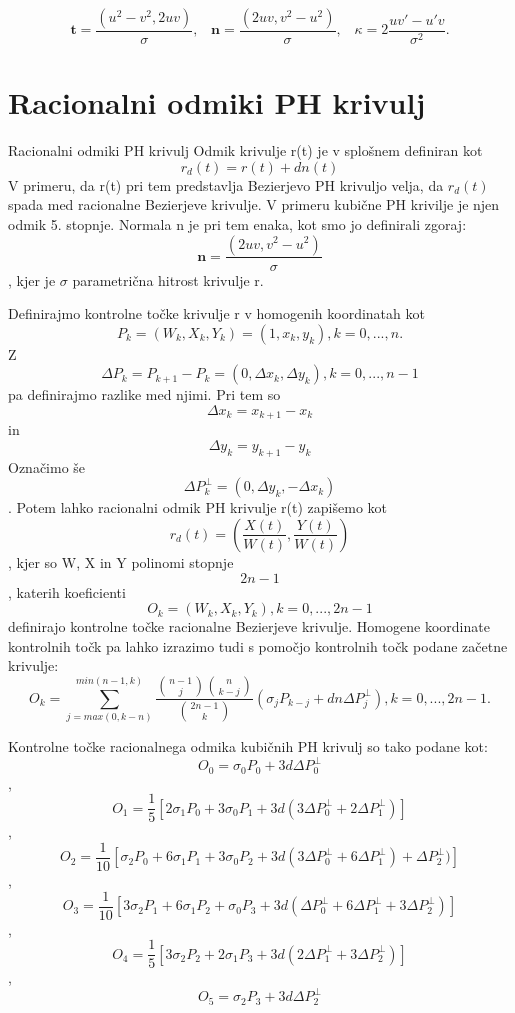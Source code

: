 \documentclass[12pt]{article}
\begin{document}
$$\textbf{t} =\frac{(u^2 - v^2, 2uv)}{\sigma},\hspace{10pt} \textbf{n} =\frac{(2uv, v^2 - u^2)}{\sigma},\hspace{10pt} \kappa = 2 \frac{uv\prime - u\prime v}{\sigma^2}.$$

\section*{Racionalni odmiki PH krivulj}
Racionalni odmiki PH krivulj
Odmik krivulje r(t) je v splošnem definiran kot
$$ r_d(t) = r(t) + dn(t)$$
V primeru, da r(t) pri tem predstavlja Bezierjevo PH krivuljo velja, 
da $r_d(t)$ spada med racionalne Bezierjeve krivulje. V primeru kubične PH krivilje 
je njen odmik 5. stopnje. Normala n je pri tem enaka, kot smo jo definirali zgoraj:
$$\textbf{n} =\frac{(2uv, v^2 - u^2)}{\sigma}$$,
kjer je $\sigma$ parametrična hitrost krivulje r.

Definirajmo kontrolne točke krivulje r v homogenih koordinatah kot
$$ P_k = (W_k, X_k, Y_k) = (1, x_k, y_k), k = 0, ..., n.$$
Z $$\Delta P_k = P_{k+1}-P_k = (0, \Delta x_k, \Delta y_k), k = 0, ..., n-1$$ 
pa definirajmo razlike med njimi. Pri tem so $$\Delta x_k = x_{k+1} - x_k$$ in $$\Delta y_k = y_{k+1} - y_k$$
Označimo še $$ \Delta P_k^{\perp} = (0, \Delta y_k, - \Delta x_k)$$. Potem lahko
racionalni odmik PH krivulje r(t) zapišemo kot
$$ r_d(t) = (\frac{X(t)}{W(t)}, \frac{Y(t)}{W(t)})$$,
kjer so W, X in Y polinomi stopnje $$2n -1$$, katerih koeficienti 
$$ O_k = (W_k, X_k, Y_k), k = 0, ..., 2n-1$$
definirajo kontrolne točke racionalne Bezierjeve krivulje. 
Homogene koordinate kontrolnih točk pa lahko izrazimo tudi s pomočjo kontrolnih točk podane začetne krivulje:
$$ O_k = \sum_{j=max(0,k-n)}^{min(n-1,k)}{\frac{\binom{n-1}{j}\binom{n}{k-j}}{\binom{2n-1}{k}}(\sigma_j P_{k-j}+d n \Delta P^{\perp}_{j})}, k = 0, ..., 2n-1.$$

Kontrolne točke racionalnega odmika kubičnih PH krivulj so tako podane kot:
$$ O_0 = \sigma_0 P_0 + 3 d \Delta P_0^{\perp}$$,
$$ O_1 = \frac{1}{5} [2 \sigma_1 P_0 + 3\sigma_0 P_1 + 3 d (3 \Delta P_0^{\perp} + 2 \Delta P_1^{\perp})]$$,
$$ O_2 = \frac{1}{10} [\sigma_2 P_0 + 6\sigma_1 P_1 + 3\sigma_0 P_2 + 3 d (3 \Delta P_0^{\perp} + 6 \Delta P_1^{\perp}) + \Delta P_2^{\perp})]$$,
$$ O_3 = \frac{1}{10} [3\sigma_2 P_1 + 6\sigma_1 P_2 + \sigma_0 P_3 + 3 d (\Delta P_0^{\perp} + 6 \Delta P_1^{\perp} + 3 \Delta P_2^{\perp})]$$,
$$ O_4 = \frac{1}{5} [3\sigma_2 P_2 + 2\sigma_1 P_3 + 3 d (2\Delta P_1^{\perp} + 3 \Delta P_2^{\perp})]$$,
$$ O_5 = \sigma_2 P_3 + 3 d \Delta P_2^{\perp}$$
\end{document}
